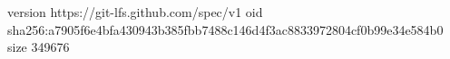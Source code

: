 version https://git-lfs.github.com/spec/v1
oid sha256:a7905f6e4bfa430943b385fbb7488c146d4f3ac8833972804cf0b99e34e584b0
size 349676
